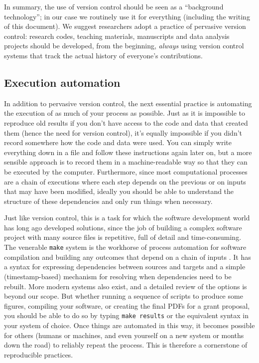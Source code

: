 \documentclass[ChapterTOCs,krantz2]{krantz} %
\begin{document}
In summary, the use of version control should be seen as a ``background
technology''; in our case we routinely use it for everything (including the
writing of this document).  We suggest researchers adopt a practice of
pervasive version control: research codes, teaching materials, manuscripts and
data analysis projects should be developed, from the beginning, \emph{always}
using version control systems that track the actual history of everyone's
contributions.

\subsection{Execution automation}

In addition to pervasive version control, the next essential practice is
automating the execution of as much of your process as possible.  Just as it is
impossible to reproduce old results if you don't have access to the code and
data that created them (hence the need for version control), it's equally
impossible if you didn't record somewhere how the code and data were used.  You
can simply write everything down in a file and follow these
instructions again later on, but a more sensible approach is
to record them in a machine-readable way so that they can be executed by the
computer.  Furthermore, since most computational processes are a chain of
executions where each step depends on the previous or on inputs that may have
been modified, ideally you should be able to understand the structure of these
dependencies and only run things when necessary.

Just like version control, this is a task for which the software development
world has long ago developed solutions, since the job of building a complex
software project with many source files is repetitive, full of detail and
time-consuming.  The venerable \texttt{make} system is the workhorse of process
automation for software compilation and building any outcomes that depend on a
chain of inputs \cite{make:2004}.  It has a syntax for expressing dependencies
between sources and targets and a simple (timestamp-based) mechanism for
resolving when dependencies need to be rebuilt.  More modern systems also
exist, and a detailed review of the options is beyond our scope.  But whether
running a sequence of scripts to produce some figures, compiling your
software, or creating the final PDFs for a grant proposal, you should be able
to do so by typing \texttt{make results} or the equivalent syntax in your
system of choice.  Once things are automated in this way, it becomes possible
for others (humans or machines, and even yourself on a new system or months
down the road) to reliably repeat the process.  This is therefore a cornerstone
of reproducible practices.
\end{document}
